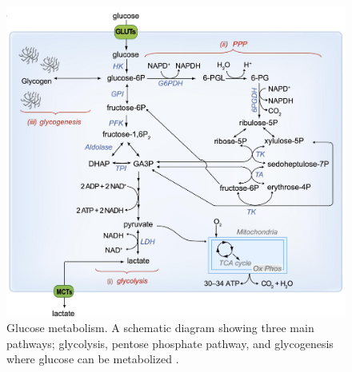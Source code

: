 \begin{figure}[h!]
  \includegraphics[width=\linewidth]{figures/10_glucose_metabolism}
  \caption{Glucose metabolism. A schematic diagram showing three main pathways; glycolysis, pentose phosphate pathway, and glycogenesis where glucose can be metabolized \citep{Belanger2011} .}
  \label{fig:10_glucose_metabolism}
\end{figure}

